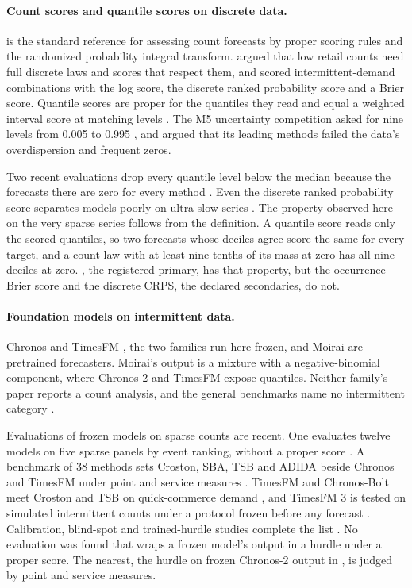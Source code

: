\paragraph{Count scores and quantile scores on discrete data.} \citet{czado2009} is the standard reference for
assessing count forecasts by proper scoring rules and the randomized probability integral transform.
\citet{kolassa2016} argued that low retail counts need full discrete laws and scores that respect them, and
\citet{wang2024} scored intermittent-demand combinations with the log score, the discrete ranked probability
score and a Brier score. Quantile scores are proper for the quantiles they read \citep{gneiting2007} and equal
a weighted interval score at matching levels \citep{bracher2021}. The M5 uncertainty competition asked for
nine levels from 0.005 to 0.995 \citep{makridakis2022}, and \citet{ziel2022} argued that its leading methods
failed the data's overdispersion and frequent zeros.

Two recent evaluations drop every quantile level below the median because the forecasts there are zero for
every method \citep{damato2025, damato2026}. Even the discrete ranked probability score separates models
poorly on ultra-slow series \citep{tichy2025}. The property observed here on the very sparse series follows
from the definition. A quantile score reads only the scored quantiles, so two forecasts whose deciles agree
score the same for every target, and a count law with at least nine tenths of its mass at zero has all nine
deciles at zero. \qs{}, the registered primary, has that property, but the occurrence Brier score and the
discrete CRPS, the declared secondaries, do not.

\paragraph{Foundation models on intermittent data.} Chronos \citep{ansari2024, chronos2-2025} and TimesFM
\citep{das2023}, the two families run here frozen, and Moirai \citep{woo2024} are pretrained forecasters.
Moirai's output is a mixture with a negative-binomial component, where Chronos-2 and TimesFM expose quantiles.
Neither family's paper reports a count analysis, and the general benchmarks name no intermittent category
\citep{aksu2024, fevbench2026}.

Evaluations of frozen models on sparse counts are recent. One evaluates twelve models on five sparse panels by
event ranking, without a proper score \citep{schoess2026}. A benchmark of 38 methods sets Croston, SBA, TSB
and ADIDA beside Chronos and TimesFM under point and service measures \citep{chin2026}. TimesFM and
Chronos-Bolt meet Croston and TSB on quick-commerce demand \citep{kim2026}, and TimesFM 3 is tested on
simulated intermittent counts under a protocol frozen before any forecast \citep{ebrahim2026,
ebrahim2026zenodo}. Calibration, blind-spot and trained-hurdle studies complete the list \citep{adler2025,
ghoroghchian2026, musat2026}. No evaluation was found that wraps a frozen model's output in a hurdle under a
proper score. The nearest, the hurdle on frozen Chronos-2 output in \citet{chin2026}, is judged by point and
service measures.

